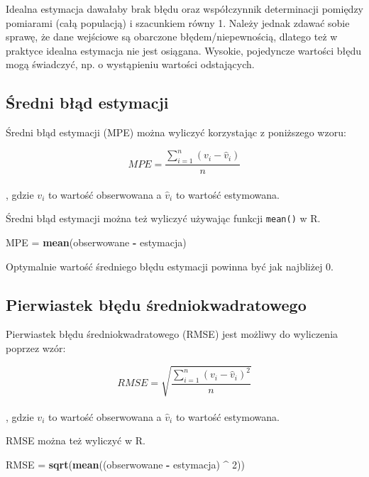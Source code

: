 \documentclass[
  paper=6in:9in,pagesize=pdftex,headinclude=on,footinclude=on,10pt]{scrbook}
\newenvironment{Shaded}{\begin{snugshade}}{\end{snugshade}}
\newcommand{\DecValTok}[1]{\textcolor[rgb]{0.00,0.00,0.81}{#1}}
\newcommand{\FunctionTok}[1]{\textcolor[rgb]{0.13,0.29,0.53}{\textbf{#1}}}
\newcommand{\NormalTok}[1]{#1}
\newcommand{\OtherTok}[1]{\textcolor[rgb]{0.56,0.35,0.01}{#1}}
\newcommand{\SpecialCharTok}[1]{\textcolor[rgb]{0.81,0.36,0.00}{\textbf{#1}}}
\begin{document}
Idealna estymacja dawałaby brak błędu oraz współczynnik determinacji pomiędzy pomiarami (całą populacją) i szacunkiem równy 1.
Należy jednak zdawać sobie sprawę, że dane wejściowe są obarczone błędem/niepewnością, dlatego też w praktyce idealna estymacja nie jest osiągana.
Wysokie, pojedyncze wartości błędu mogą świadczyć, np. o wystąpieniu wartości odstających.

\subsection{Średni błąd estymacji}\label{ux15bredni-bux142ux105d-estymacji}

Średni błąd estymacji (MPE) można wyliczyć korzystając z poniższego wzoru:

\[ MPE=\frac{\sum_{i=1}^{n}(v_i - \hat{v}_i)}{n} \]\\
, gdzie \(v_i\) to wartość obserwowana a \(\hat{v}_i\) to wartość estymowana.

Średni błąd estymacji można też wyliczyć używając funkcji \texttt{mean()} w R.

\begin{Shaded}
\begin{Highlighting}[]
\NormalTok{MPE }\OtherTok{=} \FunctionTok{mean}\NormalTok{(obserwowane }\SpecialCharTok{{-}}\NormalTok{ estymacja)}
\end{Highlighting}
\end{Shaded}

Optymalnie wartość średniego błędu estymacji powinna być jak najbliżej 0.

\subsection{Pierwiastek błędu średniokwadratowego}\label{pierwiastek-bux142ux119du-ux15bredniokwadratowego}

Pierwiastek błędu średniokwadratowego (RMSE) jest możliwy do wyliczenia poprzez wzór:

\[ RMSE=\sqrt{\frac{\sum_{i=1}^{n}(v_i-\hat{v}_i)^2}{n}} \]\\
, gdzie \(v_i\) to wartość obserwowana a \(\hat{v}_i\) to wartość estymowana.

RMSE można też wyliczyć w R.

\begin{Shaded}
\begin{Highlighting}[]
\NormalTok{RMSE }\OtherTok{=} \FunctionTok{sqrt}\NormalTok{(}\FunctionTok{mean}\NormalTok{((obserwowane }\SpecialCharTok{{-}}\NormalTok{ estymacja) }\SpecialCharTok{\^{}} \DecValTok{2}\NormalTok{))}
\end{Highlighting}
\end{Shaded}
\end{document}
